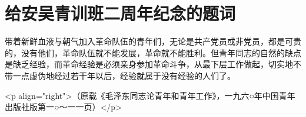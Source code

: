 \section[给安吴青训班二周年纪念的题词（一九三九年十月）]{给安吴青训班二周年纪念的题词}


带着新鲜血液与朝气加入革命队伍的青年们，无论是共产党员或非党员，都是可贵的，没有他们，革命队伍就不能发展，革命就不能胜利。但青年同志的自然的缺点是缺乏经验，而革命经验是必须亲身参加革命斗争，从最下层工作做起，切实地不带一点虚伪地经过若干年以后，经验就属于没有经验的人们了。

<p align="right">（原载《毛泽东同志论青年和青年工作》，一九六○年中国青年出版社版第一○～一一页）</p>

